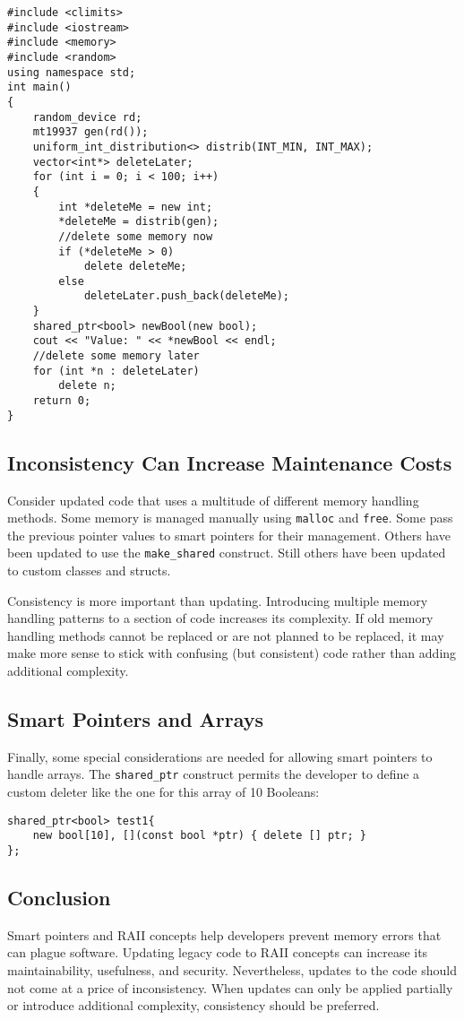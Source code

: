 \begin{lstlisting}[caption={Uninitialized Boolean},captionpos=b,style=CStyle,basicstyle=\small,label={lst:20210412:4}]
#include <climits>
#include <iostream>
#include <memory>
#include <random>
using namespace std;
int main()
{
	random_device rd;
	mt19937 gen(rd());
	uniform_int_distribution<> distrib(INT_MIN, INT_MAX);
	vector<int*> deleteLater;
	for (int i = 0; i < 100; i++)
	{
		int *deleteMe = new int;
		*deleteMe = distrib(gen);
		//delete some memory now
		if (*deleteMe > 0)
			delete deleteMe;
		else
			deleteLater.push_back(deleteMe);
	}
	shared_ptr<bool> newBool(new bool);
	cout << "Value: " << *newBool << endl;
	//delete some memory later
	for (int *n : deleteLater)
		delete n;
	return 0;
}
\end{lstlisting}

\subsection{Inconsistency Can Increase Maintenance Costs}

Consider updated code that uses a multitude of different memory handling methods. Some memory is managed manually using \texttt{malloc} and \texttt{free}. Some pass the previous pointer values to smart pointers for their management. Others have been updated to use the \texttt{make\_shared} construct. Still others have been updated to custom classes and structs.

Consistency is more important than updating. Introducing multiple memory handling patterns to a section of code increases its complexity. If old memory handling methods cannot be replaced or are not planned to be replaced, it may make more sense to stick with confusing (but consistent) code rather than adding additional complexity.

\subsection{Smart Pointers and Arrays}

Finally, some special considerations are needed for allowing smart pointers to handle arrays. The \texttt{shared\_ptr} construct permits the developer to define a custom deleter like the one for this array of 10 Booleans:

\begin{lstlisting}[caption={Custom Deleter},captionpos=b,style=CStyle,basicstyle=\small]
shared_ptr<bool> test1{
	new bool[10], [](const bool *ptr) { delete [] ptr; }
};
\end{lstlisting}

\subsection{Conclusion}

Smart pointers and RAII concepts help developers prevent memory errors that can plague software. Updating legacy code to RAII concepts can increase its maintainability, usefulness, and security. Nevertheless, updates to the code should not come at a price of inconsistency. When updates can only be applied partially or introduce additional complexity, consistency should be preferred.
